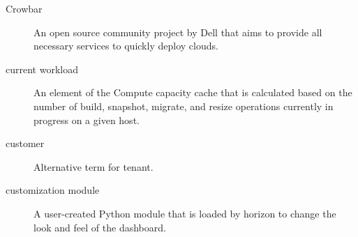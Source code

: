 \documentclass[letterpaper,10pt,english]{sphinxmanual}
\begin{document}
\begin{description}
\item[{Crowbar}] \leavevmode{}\label{_source/glossary:term-crowbar}
An open source community project by Dell that aims to provide
all necessary services to quickly deploy clouds.

\item[{current workload}] \leavevmode{}\label{_source/glossary:term-current-workload}
An element of the Compute capacity cache that is calculated
based on the number of build, snapshot, migrate, and resize operations
currently in progress on a given host.

\item[{customer}] \leavevmode{}\label{_source/glossary:term-customer}
Alternative term for tenant.

\item[{customization module}] \leavevmode{}\label{_source/glossary:term-customization-module}
A user-created Python module that is loaded by horizon to change
the look and feel of the dashboard.

\end{description}
\end{document}
